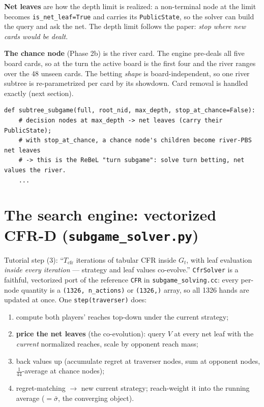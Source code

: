 \documentclass[11pt,a4paper]{article}
\newcommand{\file}[1]{\textcolor{accent}{\texttt{#1}}}
\newcommand{\fn}[1]{\texttt{#1}}
\begin{document}
\textbf{Net leaves} are how the depth limit is realized: a non-terminal node at
the limit becomes \texttt{is\_net\_leaf=True} and carries its \fn{PublicState}, so
the solver can build the query and ask the net. The depth limit follows the
paper: \emph{stop where new cards would be dealt}.

\textbf{The chance node} (Phase 2b) is the river card. The engine pre-deals all
five board cards, so at the turn the active board is the first four and the river
ranges over the 48 unseen cards. The betting \emph{shape} is board-independent,
so one river subtree is re-parametrized per card by its showdown. Card removal is
handled exactly (next section).

\begin{lstlisting}[style=py, caption={\file{public\_tree.py} --- re-rooting/truncating an already-built tree. This is how the ReBeL recursion ``builds a fresh subgame at each public state'' without touching the engine: \fn{subtree\_subgame} copies the subtree from any node and turns chance children (or depth-limit nodes) into value-net leaves.}]
def subtree_subgame(full, root_nid, max_depth, stop_at_chance=False):
    # decision nodes at max_depth -> net leaves (carry their PublicState);
    # with stop_at_chance, a chance node's children become river-PBS net leaves
    # -> this is the ReBeL "turn subgame": solve turn betting, net values the river.
    ...
\end{lstlisting}

\section{The search engine: vectorized CFR-D (\file{subgame\_solver.py})}

Tutorial step (3): ``$T_{\mathrm{cfr}}$ iterations of tabular CFR inside $G_t$,
with leaf evaluation \emph{inside every iteration} --- strategy and leaf values
co-evolve.'' \fn{CfrSolver} is a faithful, vectorized port of the reference
\texttt{CFR} in \texttt{subgame\_solving.cc}: every per-node quantity is a
\texttt{(1326, n\_actions)} or \texttt{(1326,)} array, so all 1326 hands are
updated at once. One \fn{step(traverser)} does:

\begin{enumerate}[leftmargin=1.6em, itemsep=0pt]
\item compute both players' reaches top-down under the current strategy;
\item \textbf{price the net leaves} (the co-evolution): query $V$ at every net
  leaf with the \emph{current} normalized reaches, scale by opponent reach mass;
\item back values up (accumulate regret at traverser nodes, sum at opponent
  nodes, $\tfrac{1}{44}$-average at chance nodes);
\item regret-matching $\to$ new current strategy; reach-weight it into the
  running average ($=\bar\sigma$, the converging object).
\end{enumerate}
\end{document}
